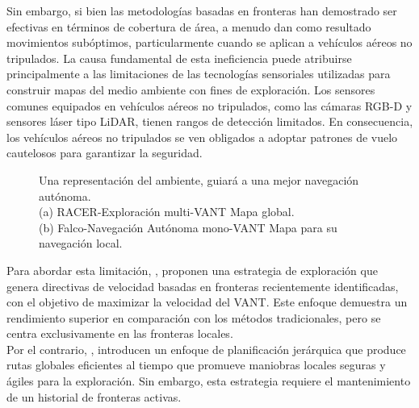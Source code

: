 \documentclass[sigconf]{acmart}
\begin{document}
Sin embargo, si bien las metodologías basadas en fronteras han demostrado ser efectivas en términos de cobertura de área, a menudo dan como resultado movimientos subóptimos, particularmente cuando se aplican a vehículos aéreos no tripulados. La causa fundamental de esta ineficiencia puede atribuirse principalmente a las limitaciones de las tecnologías sensoriales utilizadas para construir mapas del medio ambiente con fines de exploración. Los sensores comunes equipados en vehículos aéreos no tripulados, como las cámaras RGB-D y sensores láser tipo LiDAR, tienen rangos de detección limitados. En consecuencia, los vehículos aéreos no tripulados se ven obligados a adoptar patrones de vuelo cautelosos para garantizar la seguridad.\\

\begin{figure}
    \centering
    \caption{Una representación del ambiente, guiará a una mejor navegación autónoma. \\(a) RACER-Exploración multi-VANT Mapa global.\\ (b) Falco-Navegación \cite{Zhang2023} Autónoma mono-VANT Mapa para su navegación local.}
    \label{fig:foobar}
\end{figure}

Para abordar esta limitación, \citeauthor{CIESLEWSKI2017} \cite{CIESLEWSKI2017}, proponen una estrategia de exploración que genera directivas de velocidad basadas en fronteras recientemente identificadas, con el objetivo de maximizar la velocidad del VANT. Este enfoque demuestra un rendimiento superior en comparación con los métodos tradicionales, pero se centra exclusivamente en las fronteras locales.\\

Por el contrario, \citeauthor{FUEL} \cite{FUEL}, introducen un enfoque de planificación jerárquica que produce rutas globales eficientes al tiempo que promueve maniobras locales seguras y ágiles para la exploración. Sin embargo, esta estrategia requiere el mantenimiento de un historial de fronteras activas.\\
\end{document}
